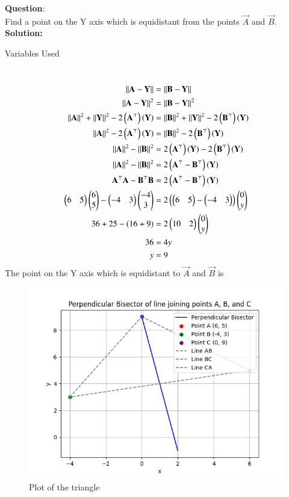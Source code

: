 \documentclass[journal]{IEEEtran}
\begin{document}
\textbf{Question}:\\
Find a point on the Y axis which is equidistant from the points  $\vec{A}$ and $\vec{B}$.
\\
\textbf{Solution: }
\begin{table}[h!]    
  \centering
  
  \caption{Variables Used}
  \label{tab10.5.3.9.1}
\end{table}\\
\begin{align}
||\mathbf{A}-\mathbf{Y}||&=||\mathbf{B}-\mathbf{Y}||\\
||\mathbf{A}-\mathbf{Y}||^2&=||\mathbf{B}-\mathbf{Y}||^2\\
||\mathbf{A}||^2+||\mathbf{Y}||^2-2\left(\mathbf{A}^\top\right)\left(\mathbf{Y}\right)&=||\mathbf{B}||^2+||\mathbf{Y}||^2-2\left(\mathbf{B}^\top\right)\left(\mathbf{Y}\right)\\
||\mathbf{A}||^2-2\left(\mathbf{A}^\top\right)\left(\mathbf{Y}\right)&=||\mathbf{B}||^2-2\left(\mathbf{B}^\top\right)\left(\mathbf{Y}\right)\\
||\mathbf{A}||^2-||\mathbf{B}||^2&=2\left(\mathbf{A}^\top\right)\left(\mathbf{Y}\right)-2\left(\mathbf{B}^\top\right)\left(\mathbf{Y}\right)\\
||\mathbf{A}||^2-||\mathbf{B}||^2&=2\left(\mathbf{A}^\top-\mathbf{B}^\top\right)\left(\mathbf{Y}\right)\\
\mathbf{{A}^\top}\mathbf{A}-\mathbf{B^\top}\mathbf{B}&=2\left(\mathbf{A}^\top-\mathbf{B}^\top\right)\left(\mathbf{Y}\right)\\
\begin{pmatrix}6&5\end{pmatrix}\begin{pmatrix}6\\5\end{pmatrix}-\begin{pmatrix}-4&3\end{pmatrix}\begin{pmatrix}-4\\3\end{pmatrix}&=2\left(\begin{pmatrix}6&5\end{pmatrix}-\begin{pmatrix}-4&3\end{pmatrix}\right)\begin{pmatrix}0\\y\end{pmatrix}\\
36+25-\left(16+9\right)&=2\begin{pmatrix}10&2\end{pmatrix}\begin{pmatrix}0\\y\end{pmatrix}\\
36&=4y\\
y&=9\\
\end{align}
The point on the Y axis which is equidistant to $\vec{A}$ and $\vec{B}$ is 
\begin{figure}[h!]
   \centering
   \includegraphics[width=0.7\linewidth]{figs/fig.png}
   \caption{Plot of the triangle}
   \label{stemplot}
\end{figure}
\end{document}
